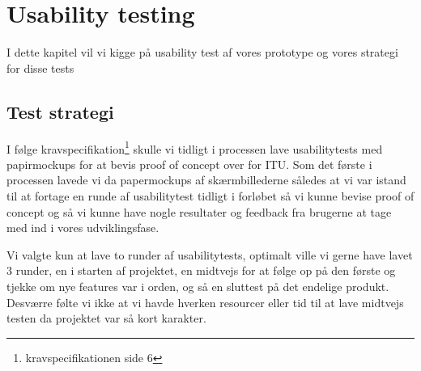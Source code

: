\chapter{Usability testing}
I dette kapitel vil vi kigge på usability test af vores prototype og vores strategi for disse tests
\section{Test strategi}
I følge kravspecifikation\footnote{kravspecifikationen side 6} skulle vi tidligt i processen lave usabilitytests med papirmockups for at bevis proof of concept over for ITU. Som det første i processen lavede vi da papermockups af skærmbillederne således at vi var istand til at 
fortage en runde af usabilitytest tidligt i forløbet så vi kunne bevise proof of concept og så vi kunne have nogle resultater og feedback fra brugerne at tage med ind i vores udviklingsfase.

Vi valgte kun at lave to runder af usabilitytests, optimalt ville vi gerne have lavet 3 runder, en i starten af projektet, en midtvejs for at følge op på den første og tjekke om nye features var i orden, og så en sluttest på det endelige produkt. Desværre følte vi ikke at vi havde hverken resourcer eller tid til at lave midtvejs testen da projektet var så kort karakter.

